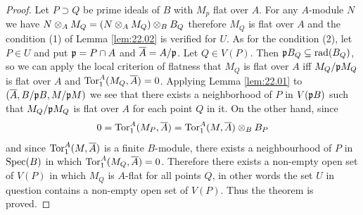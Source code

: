 \documentclass[../main]{subfiles}
\begin{document}
\begin{proof}
    Let $P\supset Q$ be prime ideals of $B$ with $M_p$ flat over $A$. For any $A$-module $N$ we have $N\otimes_A M_Q = \left(N\otimes_A M_Q\right)\otimes_B B_Q$ therefore $M_Q$ is flat over $A$ and the condition (1) of Lemma \ref{lem:22.02} is verified for $U$. As for the condition (2), let $P \in U$ and put $\mathfrak{p}=P\cap A$ and $\overline{A} = A/\mathfrak{p}$. Let $Q\in V(P)$. Then $\mathfrak{p}B_Q \subseteq \operatorname{rad}(B_Q)$, so we can apply the local criterion of flatness that $M_Q$ is flat over $A$ iff $M_Q/\mathfrak{p}M_Q$ is flat over $A$ and $\operatorname{Tor}^A_1(M_Q, \overline{A})=0$. Applying Lemma \ref{lem:22.01} to $(\overline{A}, B/\mathfrak{p}B, M/\mathfrak{p}M)$ we see that there exists a neighborhood of $P$ in $V(\mathfrak{p}B)$ such that $M_Q/\mathfrak{p}M_Q$ is flat over $A$ for each point $Q$ in it. On the other hand, since \[0 = \operatorname{Tor}^A_1(M_P,\overline{A})=\operatorname{Tor}^A_1(M,\overline{A})\otimes_B B_P\] and since $\operatorname{Tor}_1^A(M,\overline{A})$ is a finite $B$-module, there exists a neighbourhood of $P$ in $\operatorname{Spec}(B)$ in which $\operatorname{Tor}^A_1(M_Q, \overline{A})=0$. Therefore there exists a non-empty open set of $V(P)$ in which $M_Q$ is $A$-flat for all points $Q$, in other words the set $U$ in question contains a non-empty open set of $V(P)$. Thus the theorem is proved.
\end{proof}
\end{document}
